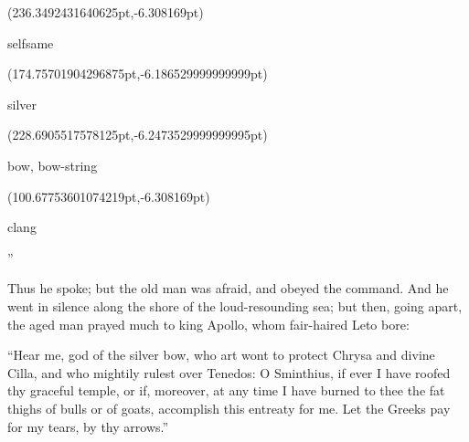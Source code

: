 \documentclass{ransom}
\begin{document}
\begin{foreignpage}
{\begin{textblock*}{42.0pt}(236.3492431640625pt,\pdfpageheight-152.37759399414062pt-6.308169pt)\parbox[b]{42.0pt}{\begin{blacktext}\begin{latin}selfsame\end{latin}\end{blacktext}}\end{textblock*}
\begin{textblock*}{50.27176pt}(174.75701904296875pt,\pdfpageheight-125.37759399414062pt-6.186529999999999pt)\parbox[b]{50.27176pt}{\begin{blacktext}\begin{latin}silver\end{latin}\end{blacktext}}\end{textblock*}
\begin{textblock*}{24.85039pt}(228.6905517578125pt,\pdfpageheight-125.37759399414062pt-6.2473529999999995pt)\parbox[b]{24.85039pt}{\begin{blacktext}\begin{latin}bow, bow-string\end{latin}\end{blacktext}}\end{textblock*}
\begin{textblock*}{37.74727pt}(100.67753601074219pt,\pdfpageheight-125.37759399414062pt-6.308169pt)\parbox[b]{37.74727pt}{\begin{blacktext}\begin{latin}clang\end{latin}\end{blacktext}}\end{textblock*}
 }
\end{foreignpage}


”



Thus he spoke; but the old man was afraid, and obeyed the command. And
he went in silence along the shore of the loud-resounding sea; but
then, going apart, the aged man prayed much to king Apollo, whom
fair-haired Leto bore:

“Hear me, god of the silver bow, who art wont to protect Chrysa and
divine Cilla, and who mightily rulest over Tenedos: O Sminthius, if
ever I have roofed thy graceful temple, or if, moreover, at any time
I have burned to thee the fat thighs of bulls or of goats, accomplish
this entreaty for me. Let the Greeks pay for my tears, by thy arrows.”
\end{document}
